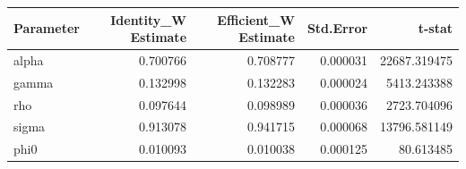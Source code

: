 \begin{tabular}{lrrrr}
\toprule
Parameter & Identity\_W Estimate & Efficient\_W Estimate & Std.Error & t-stat \\
\midrule
alpha & 0.700766 & 0.708777 & 0.000031 & 22687.319475 \\
gamma & 0.132998 & 0.132283 & 0.000024 & 5413.243388 \\
rho & 0.097644 & 0.098989 & 0.000036 & 2723.704096 \\
sigma & 0.913078 & 0.941715 & 0.000068 & 13796.581149 \\
phi0 & 0.010093 & 0.010038 & 0.000125 & 80.613485 \\
\bottomrule
\end{tabular}
